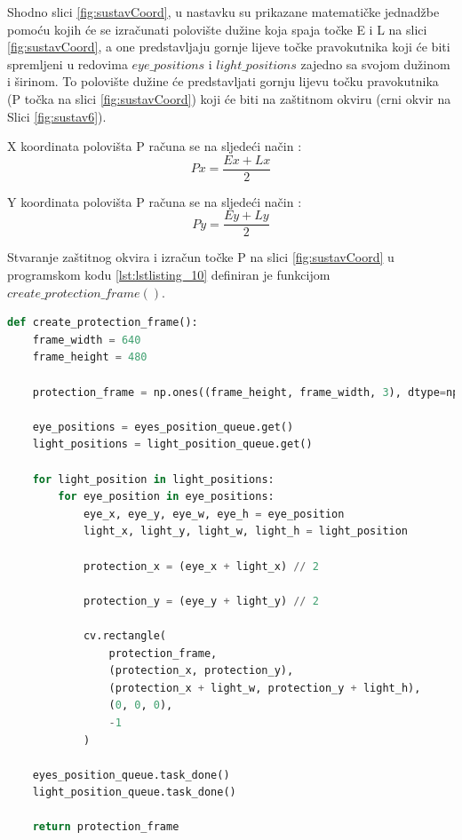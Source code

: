 \documentclass{foi}
\begin{document}
    Shodno slici \ref{fig:sustavCoord}, u nastavku su prikazane matematičke jednadžbe pomoću kojih će se izračunati polovište dužine koja spaja točke E i L na slici \ref{fig:sustavCoord}, a one predstavljaju gornje lijeve točke pravokutnika koji će biti spremljeni u redovima  $eye\_positions$ i $light\_positions$ zajedno sa svojom dužinom i širinom. To polovište dužine će predstavljati gornju lijevu točku pravokutnika (P točka na slici \ref{fig:sustavCoord}) koji će biti na zaštitnom okviru (crni okvir na Slici \ref{fig:sustav6}).

\flushleft X koordinata polovišta P računa se na sljedeći način \cite{Edutorij}:
\justifying
\begin{equation*}
Px = \frac{Ex + Lx}{2}
\end{equation*}

\flushleft Y koordinata polovišta P računa se na sljedeći način \cite{Edutorij}:
\justifying
\begin{equation*}
Py = \frac{Ey + Ly}{2}
\end{equation*}

\newpage
Stvaranje zaštitnog okvira i izračun točke P na slici \ref{fig:sustavCoord} u programskom kodu \ref{lst:lstlisting_10} definiran je funkcijom $create\_protection\_frame()$.

\begin{lstlisting}[language=Python, label={lst:lstlisting_10}, firstnumber=104, style=colored, caption={Definicija funkcije $create\_protection\_frame()$}]
def create_protection_frame():
    frame_width = 640
    frame_height = 480

    protection_frame = np.ones((frame_height, frame_width, 3), dtype=np.uint8) * 255

    eye_positions = eyes_position_queue.get()
    light_positions = light_position_queue.get()

    for light_position in light_positions:
        for eye_position in eye_positions:
            eye_x, eye_y, eye_w, eye_h = eye_position
            light_x, light_y, light_w, light_h = light_position

            protection_x = (eye_x + light_x) // 2

            protection_y = (eye_y + light_y) // 2

            cv.rectangle(
                protection_frame,
                (protection_x, protection_y),
                (protection_x + light_w, protection_y + light_h),
                (0, 0, 0),
                -1
            )

    eyes_position_queue.task_done()
    light_position_queue.task_done()

    return protection_frame
\end{lstlisting}
\end{document}
